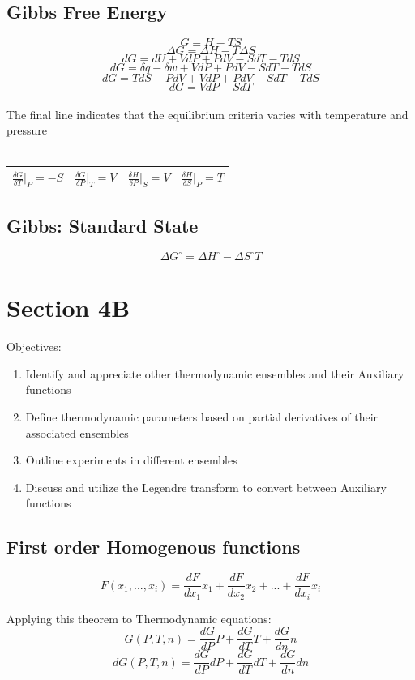 \documentclass[10pt]{article}
\begin{document}
\subsection{Gibbs Free Energy}
$$G \equiv H - TS$$
$$ \Delta G = \Delta H - T \Delta S$$
$$ dG = dU + VdP + PdV - S dT - T dS $$
$$dG = \delta q - \delta w + VdP + PdV - S dT - T dS$$
$$dG = TdS - PdV + VdP + PdV - SdT - TdS$$
$$dG = VdP - SdT$$
\\
The final line indicates that the equilibrium criteria varies with 
temperature and pressure
\\~\\
\begin{center}
    \begin{tabular}{|c|c|c|c|}
        \hline
        $\frac{\delta G}{\delta T}\Big|_{P} = -S$ 
        & $\frac{\delta G}{\delta P}\Big|_{T} = V$
        & $\frac{\delta H}{\delta P}\Big|_{S} = V$
        & $\frac{\delta H}{\delta S}\Big|_{P} =  T$
        \\
        \hline
    
    \end{tabular}  
\end{center}
\subsection{Gibbs: Standard State}
$$\Delta G^\circ = \Delta H^\circ - \Delta S^\circ T$$
\section{Section 4B}
Objectives:
\begin{enumerate}
    \item Identify and appreciate other thermodynamic ensembles and their Auxiliary functions
    \item Define thermodynamic parameters based on partial derivatives of their associated ensembles
    \item Outline experiments in different ensembles
    \item Discuss and utilize the Legendre transform to convert between Auxiliary functions
\end{enumerate}
\subsection{First order Homogenous functions}
$$F(x_1, ..., x_i) = \frac{dF}{dx_1}x_1 + \frac{dF}{dx_2}x_2 + ... + \frac{dF}{dx_i}x_i$$

Applying this theorem to Thermodynamic equations: 
$$G(P, T, n) = \frac{dG}{dP}P + \frac{dG}{dT}T + \frac{dG}{dn}n$$
$$dG(P, T, n) = \frac{dG}{dP}dP + \frac{dG}{dT}dT + \frac{dG}{dn}dn$$
\end{document}
